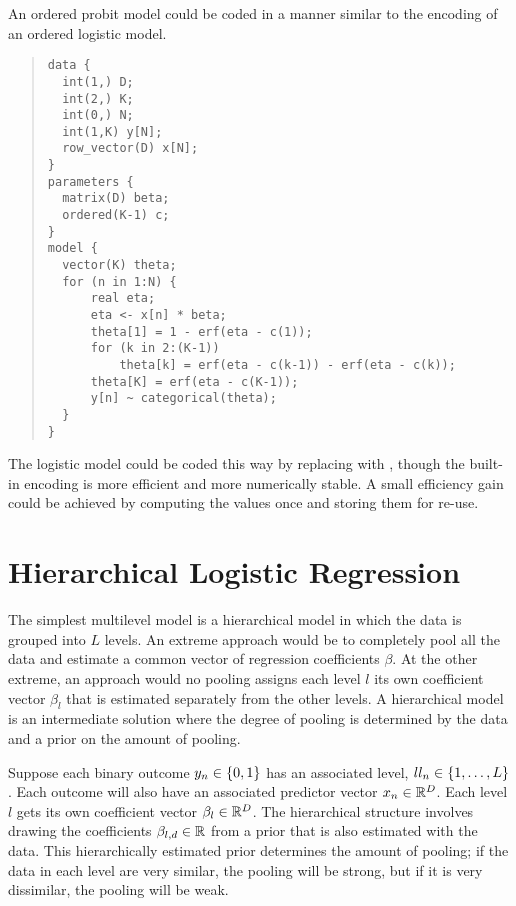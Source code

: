 An ordered probit model could be coded in a manner similar to the
\BUGS encoding of an ordered logistic model.
%
\begin{quote}
\begin{Verbatim}
data {
  int(1,) D;
  int(2,) K;
  int(0,) N;
  int(1,K) y[N];
  row_vector(D) x[N];
}
parameters {
  matrix(D) beta;
  ordered(K-1) c;
}
model {
  vector(K) theta;
  for (n in 1:N) {
      real eta;
      eta <- x[n] * beta;
      theta[1] = 1 - erf(eta - c(1));
      for (k in 2:(K-1))
          theta[k] = erf(eta - c(k-1)) - erf(eta - c(k));
      theta[K] = erf(eta - c(K-1));
      y[n] ~ categorical(theta);
  }
}
\end{Verbatim}
\end{quote}
%
The logistic model could be coded this way by replacing 
with , though the built-in encoding is more efficient
and more numerically stable.  A small efficiency gain could be
achieved by computing the values  once and
storing them for re-use.

\section{Hierarchical Logistic Regression}

The simplest multilevel model is a hierarchical model in which the
data is grouped into $L$ levels.  An extreme approach would be to
completely pool all the data and estimate a common vector of
regression coefficients $\beta$.  At the other extreme, an approach
would no pooling assigns each level $l$ its own coefficient vector
$\beta_l$ that is estimated separately from the other levels.  A
hierarchical model is an intermediate solution where the degree of
pooling is determined by the data and a prior on the amount of
pooling.

Suppose each binary outcome $y_n \in \{ 0,1 \}$ has an associated
level, $ll_n \in \{ 1,\ldots,L \}$.  Each outcome will also have
an associated predictor vector $x_n \in \mathbb{R}^D$.  Each level $l$
gets its own coefficient vector $\beta_l \in \mathbb{R}^D$.  The
hierarchical structure involves drawing the coefficients $\beta_{l,d}
\in \mathbb{R}$ from a prior that is also estimated with the data.  This
hierarchically estimated prior determines the amount of pooling; if
the data in each level are very similar, the pooling will be strong,
but if it is very dissimilar, the pooling will be weak.

